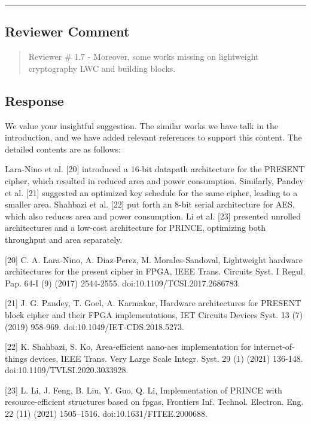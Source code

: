\noindent\rule{\linewidth}{2.0pt}

\subsection{Reviewer Comment}
\begin{mdframed}
	\begin{quote}
		Reviewer \# 1.7 - Moreover, some works missing on lightweight cryptography LWC and building blocks.
	\end{quote}
\end{mdframed}

\subsection{Response}

We value your insightful suggestion. The similar works we have talk in the introduction, and we have added relevant references to support this content. The detailed contents are as follows:

\color{blue}

Lara-Nino et al. [20] introduced a 16-bit datapath architecture for the PRESENT cipher, which resulted in reduced area and power consumption. Similarly, Pandey et al. [21] suggested an optimized key schedule for the same cipher, leading to a smaller area. Shahbazi et al. [22] put forth an 8-bit serial architecture for AES, which also reduces area and power consumption. Li et al. [23] presented unrolled architectures and a low-cost architecture for PRINCE, optimizing both throughput and area separately. 

[20] C. A. Lara-Nino, A. Diaz-Perez, M. Morales-Sandoval, Lightweight hardware architectures for the present cipher in FPGA, IEEE Trans. Circuits Syst. I Regul. Pap. 64-I (9) (2017) 2544-2555. doi:10.1109/TCSI.2017.2686783.

[21] J. G. Pandey, T. Goel, A. Karmakar, Hardware architectures for PRESENT block cipher and their FPGA implementations, IET Circuits Devices Syst. 13 (7) (2019) 958-969. doi:10.1049/IET-CDS.2018.5273.

[22] K. Shahbazi, S. Ko, Area-efficient nano-aes implementation for internet-of-things devices, IEEE Trans. Very Large Scale Integr. Syst. 29 (1) (2021) 136-148. doi:10.1109/TVLSI.2020.3033928.

[23] L. Li, J. Feng, B. Liu, Y. Guo, Q. Li, Implementation of PRINCE with resource-efficient structures based on fpgas, Frontiers Inf. Technol. Electron. Eng. 22 (11) (2021) 1505–1516. doi:10.1631/FITEE.2000688.

